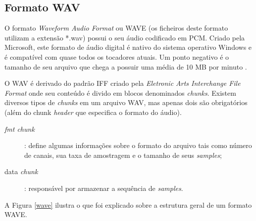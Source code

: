 \subsection{Formato WAV}

O formato \textit{Waveform Audio Format} ou WAVE (os ficheiros deste formato utilizam a extensão *.wav) possui o seu áudio codificado em PCM. Criado pela Microsoft, este formato de áudio digital é nativo do sistema operativo Windows e é compatível com quase todos os tocadores atuais. Um ponto negativo é o tamanho de seu arquivo que chega a possuir uma média de 10 MB por minuto \cite{serraaudio}.

O WAV é derivado do padrão IFF criado pela \textit{Eletronic Arts Interchange File Format} onde seu conteúdo é divido em blocos denominados \textit{chunks}. Existem diversos tipos de \textit{chunks} em um arquivo WAV, mas apenas dois são obrigatórios (além do chunk \textit{header} que especifica o formato do áudio).

\begin{description}
	\item [\textit{fmt chunk}]: define algumas informações sobre o formato do arquivo tais como número de canais, sua taxa de amostragem e o tamanho de seus \textit{samples};
	\item [data \textit{chunk}]: responsável por armazenar a sequência de \textit{samples}.
\end{description}

A Figura \ref{wave} ilustra o que foi explicado sobre a estrutura geral de um formato WAVE.

